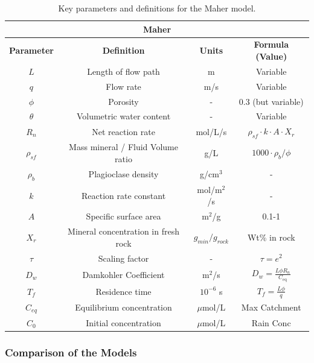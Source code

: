\begin{table}[h]
    \centering
    \renewcommand{\arraystretch}{1.3} %
    \begin{tabular}{|c|c|c|c|}
        \hline  %
        \multicolumn{4}{|c|}{\textbf{Maher}} \\  
        \hline
        \textbf{Parameter} & \textbf{Definition} & \textbf{Units} & \textbf{Formula (Value)} \\  
        $L$ & Length of flow path & m & Variable \\
        $q$ & Flow rate & m/s & Variable \\
        $\phi$ & Porosity & - & 0.3 (but variable) \\
        $\theta$ & Volumetric water content & - & Variable \\
        $R_n$ & Net reaction rate & mol/L/s & $\rho_{sf} \cdot k \cdot A \cdot X_r $ \\
        $\rho_{sf}$ & Mass mineral / Fluid Volume ratio & g/L & $1000 \cdot \rho_b / \phi$ \\
        $\rho_b$ & Plagioclase density & g/cm$^3$ & - \\
        $k$ & Reaction rate constant & mol/m$^2$/s & - \\
        $A$ & Specific surface area & m$^2$/g & 0.1-1 \\
        $X_r$ & Mineral concentration in fresh rock & $g_{min}/g_{rock}$& Wt\% in rock \\
        $\tau$ & Scaling factor & - & $\tau = e^2$ \\
        $D_w$ & Damkohler Coefficient & m$^2$/s & $D_w = \frac{L \phi R_n}{C_{\text{eq}}}$ \\
        $T_f$ & Residence time & $10^{-6}$ s & $T_f = \frac{L \phi}{q}$ \\
        $C_{eq}$ & Equilibrium concentration & $\mu$mol/L & Max Catchment \\
        $C_0$ & Initial concentration & $\mu$mol/L & Rain Conc \\
        \hline
    \end{tabular}
    \caption{Key parameters and definitions for the Maher model.}
    \label{tab:parameters2}
\end{table}

\FloatBarrier


\newpage

\subsubsection{Comparison of the Models}

